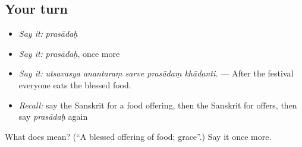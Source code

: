 \subsection*{Your turn}
\begin{itemize}
\raggedright
  \item \emph{Say it:} \emph{prasādaḥ}
  \item \emph{Say it:} \emph{prasādaḥ}, once more
  \item \emph{Say it:} \emph{utsavasya anantaraṃ sarve prasādaṃ khādanti.} — After the festival everyone eats the blessed food.
  \item \emph{Recall:} say the Sanskrit for a food offering, then the Sanskrit for offers, then say \emph{prasādaḥ} again
\end{itemize}

\begin{tcolorbox}[breakable,colback=teal!4,colframe=teal!35!black,title={Before you move on}]
What does  mean? (\textquotedblleft{}A blessed offering of food; grace\textquotedblright{}.) Say it once more.
\end{tcolorbox}
